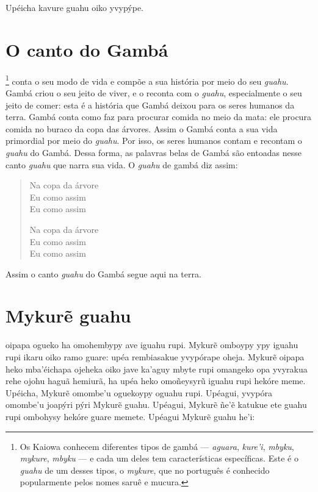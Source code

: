 Upéicha kavure guahu oiko yvypýpe.

\chapter{O canto do Gambá}

\footnote{Os Kaiowa conhecem diferentes tipos de gambá ---
  \textit{aguara}, \textit{kure'i}, \textit{mbyku}, \textit{mykure},
  \textit{mbyku} --- e cada um deles tem características específicas. Este é
  o \textit{guahu} de um desses tipos, o \textit{mykure}, que no português é
  conhecido popularmente pelos nomes saruê e mucura.} conta o seu modo
de vida e compõe a sua história por meio do seu \textit{guahu}. Gambá
criou o seu jeito de viver, e o reconta com o \textit{guahu},
especialmente o seu jeito de comer: esta é a história que Gambá deixou
para os seres humanos da terra. Gambá conta como faz para procurar
comida no meio da mata: ele procura comida no buraco da copa das
árvores. Assim o Gambá conta a sua vida primordial por meio do
\textit{guahu}. Por isso, os seres humanos contam e recontam o
\textit{guahu} do Gambá. Dessa forma, as palavras belas de Gambá são
entoadas nesse canto \textit{guahu} que narra sua vida. O \textit{guahu} de
gambá diz assim:

\begin{verse}
Na copa da árvore\\
Eu como assim\\
Eu como assim

Na copa da árvore\\
Eu como assim\\
Eu como assim
\end{verse}

Assim o canto \textit{guahu} do Gambá segue aqui na terra.

\chapter{Mykurẽ guahu}

 oipapa ogueko ha omohembypy ave iguahu rupi. Mykurẽ omboypy ypy
iguahu rupi ikaru oiko ramo guare: upéa rembiasakue yvypórape oheja.
Mykurẽ oipapa heko mba'éichapa ojeheka oiko jave ka'aguy mbyte rupi
omangeko opa yvyrakua rehe ojohu haguã hemiurã, ha upéa heko omoñeysyrũ
iguahu rupi hekóre meme. Upéicha, Mykurẽ omombe'u oguekoypy oguahu rupi.
Upéagui, yvypóra omombe'u joapýri pýri Mykurẽ guahu. Upéagui, Mykurẽ
ñe'ẽ katukue ete guahu rupi ombohysy hekóre guare memete. Upéagui Mykurẽ
guahu he'i:

